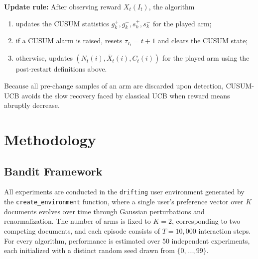 \documentclass[pdflatex,sn-mathphys-num]{sn-jnl}
\theoremstyle{thmstyleone}%
\theoremstyle{thmstyletwo}%
\theoremstyle{thmstylethree}%
\begin{document}
\begin{itemize}
\textbf{Update rule:}
After observing reward $X_t(I_t)$, the algorithm
\begin{enumerate}
\item updates the CUSUM statistics $g_k^+,g_k^-,s_k^+,s_k^-$ for the played arm;
\item if a CUSUM alarm is raised, resets $\tau_{I_t}=t+1$ and clears the CUSUM state;
\item otherwise, updates $(N_t(i),\bar X_t(i),C_t(i))$ for the played arm using the post-restart definitions above.
\end{enumerate}
Because all pre-change samples of an arm are discarded upon detection,
CUSUM-UCB avoids the slow recovery faced by classical UCB when reward
means abruptly decrease. 
\end{itemize}

   







\section{Methodology}\label{sec3}

\subsection{Bandit Framework}\label{sec3-1}



All experiments are conducted in the \texttt{drifting} user environment generated
by the \texttt{create\_environment} function, where a single user’s preference
vector over \(K\) documents evolves over time through Gaussian perturbations and
renormalization. The number of arms is fixed to \(K = 2\), corresponding to two
competing documents, and each episode consists of \(T = 10{,}000\) interaction
steps. For every algorithm, performance is estimated over \(50\) independent
experiments, each initialized with a distinct random seed drawn from
\(\{0,\dots,99\}\).\cite{swucb,epsilon_greedy_ns,cusumucb,exp3s}
\end{document}
